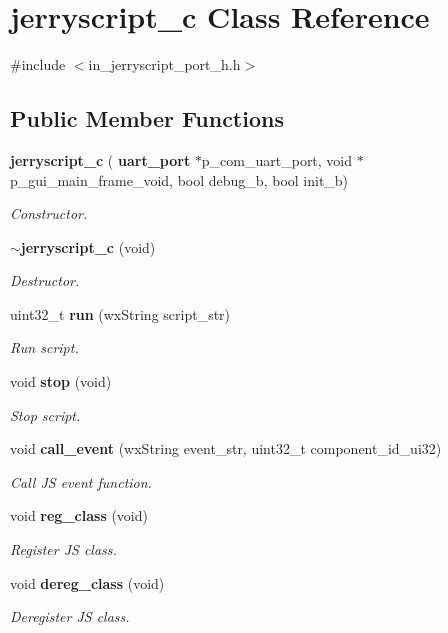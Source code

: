 \section{jerryscript\+\_\+c Class Reference}
\label{classjerryscript__c}


{\ttfamily \#include $<$in\+\_\+jerryscript\+\_\+port\+\_\+h.\+h$>$}

\subsection*{Public Member Functions}
\begin{DoxyCompactItemize}
\item 
\textbf{ jerryscript\+\_\+c} (\textbf{ uart\+\_\+port} $\ast$p\+\_\+com\+\_\+uart\+\_\+port, void $\ast$p\+\_\+gui\+\_\+main\+\_\+frame\+\_\+void, bool debug\+\_\+b, bool init\+\_\+b)
\begin{DoxyCompactList}\small\item\em Constructor. \end{DoxyCompactList}\item 
\textbf{ $\sim$jerryscript\+\_\+c} (void)
\begin{DoxyCompactList}\small\item\em Destructor. \end{DoxyCompactList}\item 
uint32\+\_\+t \textbf{ run} (wx\+String script\+\_\+str)
\begin{DoxyCompactList}\small\item\em Run script. \end{DoxyCompactList}\item 
void \textbf{ stop} (void)
\begin{DoxyCompactList}\small\item\em Stop script. \end{DoxyCompactList}\item 
void \textbf{ call\+\_\+event} (wx\+String event\+\_\+str, uint32\+\_\+t component\+\_\+id\+\_\+ui32)
\begin{DoxyCompactList}\small\item\em Call JS event function. \end{DoxyCompactList}\item 
void \textbf{ reg\+\_\+class} (void)
\begin{DoxyCompactList}\small\item\em Register JS class. \end{DoxyCompactList}\item 
void \textbf{ dereg\+\_\+class} (void)
\begin{DoxyCompactList}\small\item\em Deregister JS class. \end{DoxyCompactList}\end{DoxyCompactItemize}


